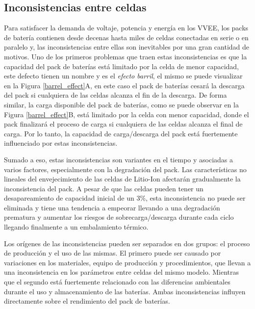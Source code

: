 \newpage

\subsection{Inconsistencias entre celdas}

Para satisfacer la demanda de voltaje, potencia y energ\'ia en los 
\acrshort{VVEE}, los packs de bater\'ia contienen desde decenas hasta miles de
celdas conectadas en serie o en paralelo y, las inconsistencias entre ellas son
inevitables por una gran cantidad de motivos. Uno de los primeros problemas que
traen estas inconsistencias es que la capacidad del pack de bater\'ias est\'a
limitado por la celda de menor capacidad, este defecto tienen un nombre y es el
\emph{efecto barril}, el mismo se puede visualizar en la Figura 
\ref{barrel_effect}A, en este caso el pack de bater\'ias cesar\'a la descarga del
pack si cualquiera de las celdas alcanza el fin de la descarga. De forma
similar, la carga disponible del pack de bater\'ias, como se puede observar en
la Figura \ref{barrel_effect}B, est\'a limitado por la celda con menor
capacidad, donde el pack finalizar\'a el proceso de carga si cualquiera de las
celdas alcanza el final de carga. Por lo tanto, la capacidad de carga/descarga
del pack est\'a fuertemente influenciado por estas inconsistencias.

Sumado a eso, estas inconsistencias son variantes en el tiempo y asociadas a
varios factores, especialmente con la degradaci\'on del pack. Las
caracter\'isticas no lineales del envejecimiento de las celdas de Litio-Ion
afectar\'an gradualmente la inconsistencia del pack. A pesar de que las celdas
pueden tener un desapareamiento de capacidad inicial de un 3\%, esta
inconsistencia no puede ser eliminada y tiene una tendencia a empeorar llevando
a una degradaci\'on prematura y aumentar los riesgos de sobrecarga/descarga
durante cada ciclo llegando finalmente a un embalamiento t\'ermico.

Los or\'igenes de las inconsistencias pueden ser separados en dos grupos: el
proceso de producci\'on y el uso de las mismas. El primero puede ser causado por
variaciones en los materiales, equipo de producci\'on y procedimientos, que
llevan a una inconsistencia en los par\'ametros entre celdas del mismo modelo.
Mientras que el segundo est\'a fuertemente relacionado con las diferencias
ambientales durante el uso y almacenamiento de las bater\'ias. Ambas
inconsistencias influyen directamente sobre el rendimiento del pack de
bater\'ias.


